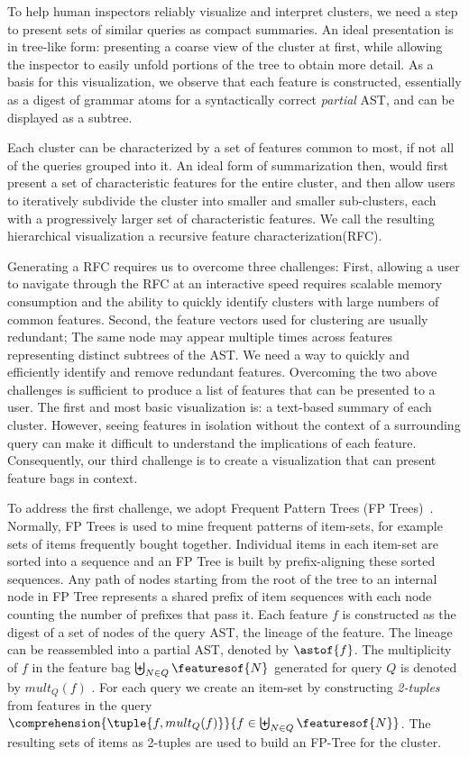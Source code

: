 
To help human inspectors reliably visualize and interpret clusters, we need a step to present sets of similar queries as compact summaries. An ideal presentation is in tree-like form: presenting a coarse view of the cluster at first, while allowing the inspector to easily unfold portions of the tree to obtain more detail.
As a basis for this visualization, we observe that each feature is constructed, essentially as a digest of grammar atoms for a syntactically correct \textit{partial} AST, and can be displayed as a subtree.

Each cluster can be characterized by a set of features common to most, if not all of the queries grouped into it.  An ideal form of summarization then, would first present a set of characteristic features for the entire cluster, and then allow users to iteratively subdivide the cluster into smaller and smaller sub-clusters, each with a progressively larger set of characteristic features.  We call the resulting hierarchical visualization a recursive feature characterization(RFC).

Generating a RFC requires us to overcome three challenges:  First, allowing a user to navigate through the RFC at an interactive speed requires scalable memory consumption and the ability to quickly identify clusters with large numbers of common features.  Second, the feature vectors used for clustering are usually redundant; The same node may appear multiple times across features representing distinct subtrees of the AST.  We need a way to quickly and efficiently identify and remove redundant features.
Overcoming the two above challenges is sufficient to produce a list of features that can be presented to a user. The first and most basic visualization is: a text-based summary of each cluster.  However, seeing features in isolation without the context of a surrounding query can make it difficult to understand the implications of each feature.  Consequently, our third challenge is to create a visualization that can present feature bags in context.

To address the first challenge, we adopt Frequent Pattern Trees (FP Trees)~\cite{han2004mining}.
Normally, FP Trees is used to mine frequent patterns of item-sets, for example sets of items frequently bought together.
Individual items in each item-set are sorted into a sequence and an FP Tree is built by prefix-aligning these sorted sequences. 
Any path of nodes starting from the root of the tree to an internal node in FP Tree represents a shared prefix of item sequences with each node counting the number of prefixes that pass it.
Each feature $f$ is constructed as the digest of a set of nodes of the query AST, the lineage of the feature.  The lineage can be reassembled into a partial AST, denoted by $\astof{f}$.  The multiplicity of $f$ in the feature bag $\biguplus_{N \in Q}\featuresof{N}$ generated for query $Q$ is denoted by $mult_Q(f)$ . For each query we create an item-set by constructing \textit{2-tuples} from features in the query $\comprehension{\tuple{f, mult_Q(f)}}{f \in \biguplus_{N \in Q}\featuresof{N}}$.  The resulting sets of items as 2-tuples are used to build an FP-Tree for the cluster.

